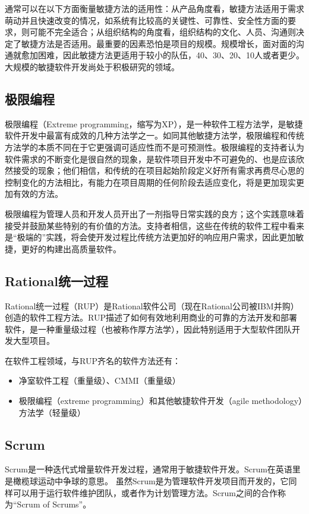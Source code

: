 通常可以在以下方面衡量敏捷方法的适用性：从产品角度看，敏捷方法适用于需求萌动并且快速改变的情况，如系统有比较高的关键性、可靠性、安全性方面的要求，则可能不完全适合；从组织结构的角度看，组织结构的文化、人员、沟通则决定了敏捷方法是否适用。最重要的因素恐怕是项目的规模。规模增长，面对面的沟通就愈加困难，因此敏捷方法更适用于较小的队伍，40、30、20、10人或者更少。大规模的敏捷软件开发尚处于积极研究的领域。

\subsection{极限编程}
极限编程（Extreme programming，缩写为XP），是一种软件工程方法学，是敏捷软件开发中最富有成效的几种方法学之一。如同其他敏捷方法学，极限编程和传统方法学的本质不同在于它更强调可适应性而不是可预测性。极限编程的支持者认为软件需求的不断变化是很自然的现象，是软件项目开发中不可避免的、也是应该欣然接受的现象；他们相信，和传统的在项目起始阶段定义好所有需求再费尽心思的控制变化的方法相比，有能力在项目周期的任何阶段去适应变化，将是更加现实更加有效的方法。

极限编程为管理人员和开发人员开出了一剂指导日常实践的良方；这个实践意味着接受并鼓励某些特别的有价值的方法。支持者相信，这些在传统的软件工程中看来是“极端的”实践，将会使开发过程比传统方法更加好的响应用户需求，因此更加敏捷，更好的构建出高质量软件。

\subsection{Rational统一过程}
Rational统一过程（RUP）是Rational软件公司（现在Rational公司被IBM并购）创造的软件工程方法。RUP描述了如何有效地利用商业的可靠的方法开发和部署软件，是一种重量级过程（也被称作厚方法学），因此特别适用于大型软件团队开发大型项目。

在软件工程领域，与RUP齐名的软件方法还有：
\begin{itemize}
\item 净室软件工程（重量级）、CMMI（重量级）
\item 极限编程（extreme programming）和其他敏捷软件开发（agile methodology）方法学（轻量级）
\end{itemize}

\subsection{Scrum}

Scrum是一种迭代式增量软件开发过程，通常用于敏捷软件开发。Scrum在英语里是橄榄球运动中争球的意思。
虽然Scrum是为管理软件开发项目而开发的，它同样可以用于运行软件维护团队，或者作为计划管理方法。Scrum之间的合作称为“Scrum of Scrums”。

